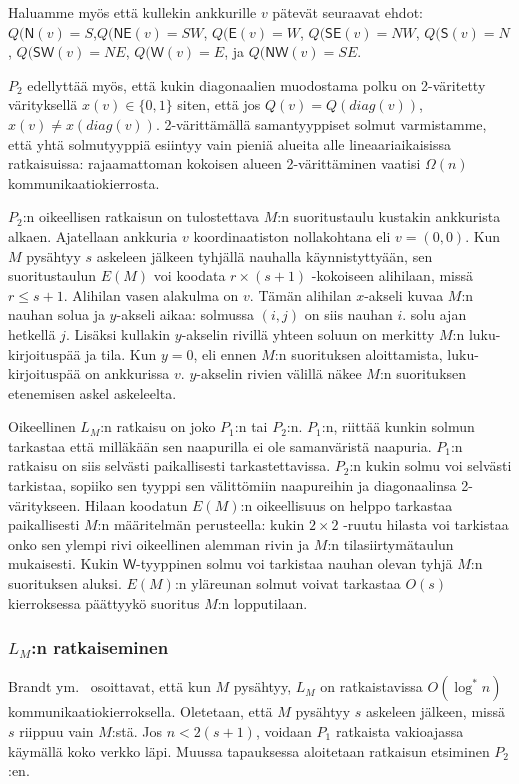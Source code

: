 \documentclass[12pt,finnish]{tktltiki2}
\theoremstyle{definition}
\theoremstyle{remark}
\begin{document}
Haluamme myös että kullekin ankkurille $v$ pätevät seuraavat ehdot: $Q(\mathsf{N}(v) = S$,$Q(\mathsf{NE}(v) = SW$, $Q(\mathsf{E}(v) = W$, $Q(\mathsf{SE}(v) = NW$, $Q(\mathsf{S}(v) = N$, $Q(\mathsf{SW}(v) = NE$, $Q(\mathsf{W}(v) = E$, ja $Q(\mathsf{NW}(v) = SE$.

$P_2$ edellyttää myös, että kukin diagonaalien muodostama polku on 2-väritetty värityksellä $x(v) \in \{0, 1\}$ siten, että jos $Q(v) = Q(diag(v))$, $x(v) \neq x(diag(v))$. 2-värittämällä samantyyppiset solmut varmistamme, että yhtä solmutyyppiä esiintyy vain pieniä alueita alle lineaariaikaisissa ratkaisuissa: rajaamattoman kokoisen alueen 2-värittäminen vaatisi $\Omega(n)$ kommunikaatiokierrosta.

$P_2$:n oikeellisen ratkaisun on tulostettava $M$:n suoritustaulu kustakin ankkurista alkaen. Ajatellaan ankkuria $v$ koordinaatiston nollakohtana eli $v = (0, 0)$. Kun $M$ pysähtyy $s$ askeleen jälkeen tyhjällä nauhalla käynnistyttyään, sen suoritustaulun $E(M)$ voi koodata $r \times (s+1)$ -kokoiseen alihilaan, missä $r \leq s + 1$. Alihilan vasen alakulma on $v$. Tämän alihilan $x$-akseli kuvaa $M$:n nauhan solua ja $y$-akseli aikaa: solmussa $(i, j)$ on siis nauhan $i.$ solu ajan hetkellä $j$. Lisäksi kullakin $y$-akselin rivillä yhteen soluun on merkitty $M$:n luku-kirjoituspää ja tila. Kun $y = 0$, eli ennen $M$:n suorituksen aloittamista, luku-kirjoituspää on ankkurissa $v$. $y$-akselin rivien välillä näkee $M$:n suorituksen etenemisen askel askeleelta. 

Oikeellinen $L_M$:n ratkaisu on joko $P_1$:n tai $P_2$:n. $P_1$:n, riittää kunkin solmun tarkastaa että milläkään sen naapurilla ei ole samanväristä naapuria. $P_1$:n ratkaisu on siis selvästi paikallisesti tarkastettavissa. $P_2$:n kukin solmu voi selvästi tarkistaa, sopiiko sen tyyppi sen välittömiin naapureihin ja diagonaalinsa 2-väritykseen. Hilaan koodatun $E(M)$:n oikeellisuus on helppo tarkastaa paikallisesti $M$:n määritelmän perusteella: kukin $2 \times 2$ -ruutu hilasta voi tarkistaa onko sen ylempi rivi oikeellinen alemman rivin ja $M$:n tilasiirtymätaulun mukaisesti. Kukin $\mathsf{W}$-tyyppinen solmu voi tarkistaa nauhan olevan tyhjä $M$:n suorituksen aluksi. $E(M)$:n yläreunan solmut voivat tarkastaa $O(s)$ kierroksessa päättyykö suoritus $M$:n lopputilaan.

\subsubsection{$L_M$:n ratkaiseminen}
Brandt ym.~\cite{brandt} osoittavat, että kun $M$ pysähtyy, $L_M$ on ratkaistavissa $O(\log^* n)$ kommunikaatiokierroksella. Oletetaan, että $M$ pysähtyy $s$ askeleen jälkeen, missä $s$ riippuu vain $M$:stä. Jos $n < 2(s + 1)$, voidaan $P_1$ ratkaista vakioajassa käymällä koko verkko läpi. Muussa tapauksessa aloitetaan ratkaisun etsiminen $P_2$:en.
\end{document}
